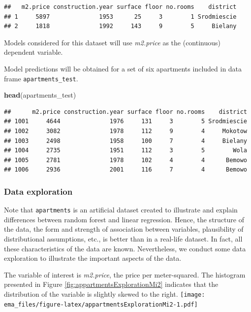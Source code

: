 \documentclass[12pt,]{krantz}
\newenvironment{Shaded}{\begin{snugshade}}{\end{snugshade}}
\newcommand{\KeywordTok}[1]{\textcolor[rgb]{0.13,0.29,0.53}{\textbf{#1}}}
\newcommand{\NormalTok}[1]{#1}
\begin{document}
\begin{verbatim}
##   m2.price construction.year surface floor no.rooms    district
## 1     5897              1953      25     3        1 Srodmiescie
## 2     1818              1992     143     9        5     Bielany
\end{verbatim}

Models considered for this dataset will use \emph{m2.price} as the (continuous) dependent variable.

Model predictions will be obtained for a set of six apartments included in data frame \texttt{apartments\_test}.

\begin{Shaded}
\begin{Highlighting}[]
\KeywordTok{head}\NormalTok{(apartments\_test)}
\end{Highlighting}
\end{Shaded}

\begin{verbatim}
##      m2.price construction.year surface floor no.rooms    district
## 1001     4644              1976     131     3        5 Srodmiescie
## 1002     3082              1978     112     9        4     Mokotow
## 1003     2498              1958     100     7        4     Bielany
## 1004     2735              1951     112     3        5        Wola
## 1005     2781              1978     102     4        4      Bemowo
## 1006     2936              2001     116     7        4      Bemowo
\end{verbatim}

\hypertarget{exploration-apartments}{%
\subsubsection{Data exploration}\label{exploration-apartments}}

Note that \texttt{apartments} is an artificial dataset created to illustrate and explain differences between random forest and linear regression. Hence, the structure of the data, the form and strength of association between variables, plausibility of distributional assumptions, etc., is better than in a real-life dataset. In fact, all these characteristics of the data are known. Nevertheless, we conduct some data exploration to illustrate the important aspects of the data.

The variable of interest is \emph{m2.price}, the price per meter-squared. The histogram presented in Figure \ref{fig:appartmentsExplorationMi2} indicates that the distribution of the variable is slightly skewed to the right.
\texttt{[image: ema\_files/figure-latex/appartmentsExplorationMi2-1.pdf]}
\end{document}
